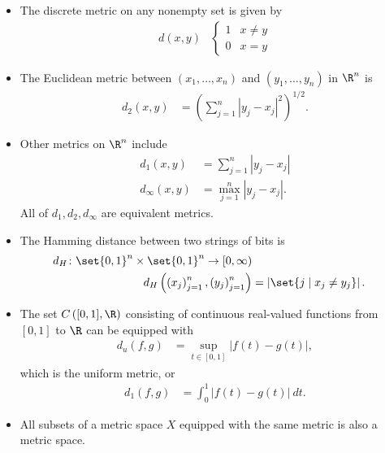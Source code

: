 \begin{example}\hfill
  \begin{itemize}
    \item The discrete metric on any nonempty set is given by
      \begin{align*}
        d\left(x,y\right) & \begin{cases}
          1 & x\neq y\\
          0 & x = y
        \end{cases}
      \end{align*}
    \item The Euclidean metric between $\left(x_1,\dots,x_n\right)$ and $\left(y_1,\dots,y_n\right)$ in $\R^n$ is
      \begin{align*}
        d_{2}\left(x,y\right) &= \left(\sum_{j=1}^{n}\left\vert y_j-x_j \right\vert^2\right)^{1/2}.
      \end{align*}
    \item Other metrics on $\R^n$ include
      \begin{align*}
        d_1\left(x,y\right) &= \sum_{j=1}^{n}\left\vert y_j-x_j \right\vert\\
        d_{\infty}\left(x,y\right) &= \max_{j=1}^{n}\left\vert y_j - x_j \right\vert.
      \end{align*}
      All of $d_1,d_2,d_{\infty}$ are equivalent metrics.
    \item The Hamming distance between two strings of bits is
      \begin{align*}
        d_{H}\colon \set{0,1}^{n}\times \set{0,1}^{n}\rightarrow [0,\infty)\\
        d_{H}\left(\left(x_{j}\right)_{j=1}^{n},\left(y_j\right)_{j=1}^{n}\right) &= \left\vert \set{j\mid x_j\neq y_j} \right\vert.
      \end{align*}
    \item The set $C\left([0,1],\R\right)$ consisting of continuous real-valued functions from $[0,1]$ to $\R$ can be equipped with
      \begin{align*}
        d_u\left(f,g\right) &= \sup_{t\in [0,1]}\left\vert f(t) - g(t) \right\vert,
      \end{align*}
      which is the uniform metric, or
      \begin{align*}
        d_{1}\left(f,g\right) &= \int_{0}^{1} \left\vert f(t)-g(t) \right\vert\:dt.
      \end{align*}
    \item All subsets of a metric space $X$ equipped with the same metric is also a metric space.

\end{itemize}
\end{example}
